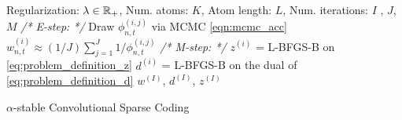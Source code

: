 
 
%


    \begin{algorithm}[H]
      \begin{algorithmic}[1] %
      \REQUIRE Regularization: $\lambda \in \mathbb{R}_+$, Num. atoms: $K$, Atom length: $L$, Num. iterations: $I$ , $J$, $M$
          \STATE \textit{\color{blue} /* E-step: */} %
          \STATE Draw $\phi_{n,t}^{(i,j)}$ via MCMC \eqref{eqn:mcmc_acc}
          \ENDFOR
          \STATE $w_{n,t}^{(i)} \approx (1/J) \sum\nolimits_{j=1}^{J} 1/{\phi_{n,t}^{(i,j)}}$
          \STATE \textit{\color{blue} /* M-step: */} %
                  \STATE $z^{(i)}$ = L-BFGS-B on \eqref{eq:problem_definition_z}
                  \STATE $d^{(i)}$ = L-BFGS-B on the dual of \eqref{eq:problem_definition_d}
              \ENDFOR
        \ENDFOR
        \RETURN $w^{(I)}$, $d^{(I)}$, $z^{(I)}$
        \end{algorithmic}
        \caption{$\alpha$-stable Convolutional Sparse Coding}
        \label{alg:alpha_csc}
    \end{algorithm}

